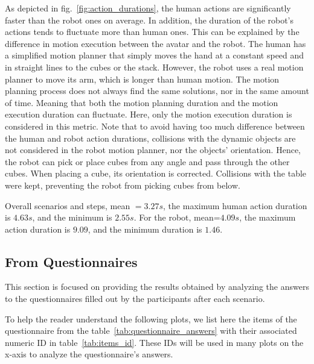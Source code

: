 As depicted in fig.~\ref{fig:action_durations}, the human actions are significantly faster than the robot ones on average. In addition, the duration of the robot's actions tends to fluctuate more than human ones. This can be explained by the difference in motion execution between the avatar and the robot. The human has a simplified motion planner that simply moves the hand at a constant speed and in straight lines to the cubes or the stack. However, the robot uses a real motion planner to move its arm, which is longer than human motion. The motion planning process does not always find the same solutions, nor in the same amount of time. Meaning that both the motion planning duration and the motion execution duration can fluctuate. Here, only the motion execution duration is considered in this metric. Note that to avoid having too much difference between the human and robot action durations, collisions with the dynamic objects are not considered in the robot motion planner, nor the objects' orientation. Hence, the robot can pick or place cubes from any angle and pass through the other cubes. When placing a cube, its orientation is corrected. Collisions with the table were kept, preventing the robot from picking cubes from below.  

Overall scenarios and steps, mean $=3.27s$, the maximum human action duration is $4.63s$, and the minimum is $2.55s$. For the robot, mean=$4.09s$, the maximum action duration is $9.09$, and the minimum duration is $1.46$.

\subsection{From Questionnaires}

This section is focused on providing the results obtained by analyzing the answers to the questionnaires filled out by the participants after each scenario.

To help the reader understand the following plots, we list here the items of the questionnaire from the table~\ref{tab:questionnaire_answers} with their associated numeric ID in table~\ref{tab:items_id}. These IDs will be used in many plots on the x-axis to analyze the questionnaire's answers.

